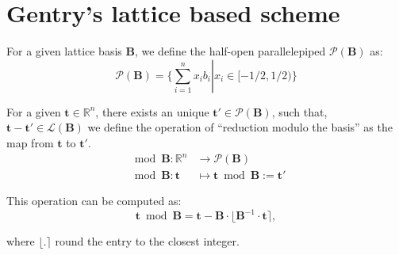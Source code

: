 \chapter{Gentry's lattice based scheme}

\begin{definition}
For a given lattice basis $\mathbf B$, we define the half-open parallelepiped $\mathcal P (\mathbf B)$ as:
$$\mathcal P (\mathbf B)=\Big\{\sum_{i=1}^{n}x_ib_i\left|\right. x_i\in [-1/2,1/2)\Big\}$$
\end{definition}

\begin{proposition}\cite{stan16}
For a given $\mathbf t \in\mathbb{R}^n$, there exists an unique $\mathbf t'\in\mathcal P(\mathbf B)$, such that, $\mathbf t-\mathbf t' \in\mathcal L(\mathbf B)$ we define the operation of ``reduction modulo the basis'' as the map from $\mathbf t$ to $\mathbf t'$.
\begin{align*}
    \mod \mathbf B:\mathbb{R}^n&\to\mathcal P(\mathbf B)\\
    \mod \mathbf B:\mathbf t &\mapsto \mathbf t \bmod \mathbf B := \mathbf t'
\end{align*}

This operation can be computed as:
$$\mathbf t\bmod \mathbf B=\mathbf t-\mathbf B\cdot\lfloor{\mathbf B}^{-1}\cdot\mathbf t\rceil,$$

where $\lfloor.\rceil$ round the entry to the closest integer.
\end{proposition}

